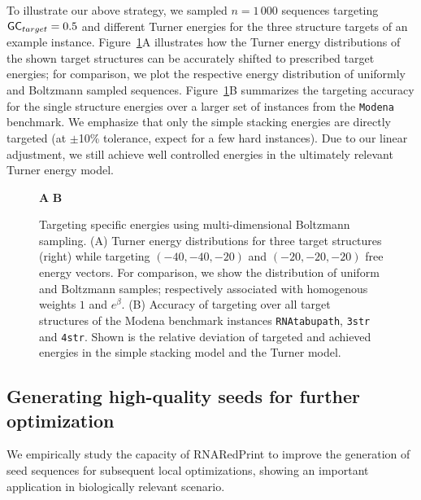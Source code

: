 \documentclass{bioinfo}
\makeatletter
\newlength{\@aligneps}
\newcommand{\includegraphicstop}[2][]{%
\sbox{\@alignepsbox}{\texttt{[image: \#2]}}%
\setlength{\@aligneps}{-\ht\@alignepsbox}%
\addtolength{\@aligneps}{2ex}%
\raisebox{\@aligneps}{\usebox{\@alignepsbox}}}
\newcommand{\Software}[1]{{\ttfamily #1}}
\newcommand{\ourprog}{\Software{RNARedPrint}}
\makeatother
\begin{document}
To illustrate our above strategy, we sampled $n=1\,000$ sequences
targeting ${\sf GC}_{target}=0.5$ and different Turner energies for
the three structure targets of an example
instance. Figure~\ref{fig:energydist}A illustrates how the Turner
energy distributions of the shown target structures can be accurately
shifted to prescribed target energies; for comparison, we plot the
respective energy distribution of uniformly and Boltzmann sampled
sequences. Figure~\ref{fig:energydist}B summarizes the targeting accuracy for the single structure energies over a larger set of instances
from the \texttt{Modena} benchmark. We emphasize that only the simple stacking energies
are directly targeted (at $\pm$10\% tolerance, expect for a few hard
instances). Due to our linear adjustment, we still achieve well
controlled energies in the ultimately relevant Turner energy model.
\begin{figure}[t]
  \begin{center}
    {\sf \bfseries A}\includegraphicstop[width=0.57\textwidth]{Figs/energy_distribution}
    {\sf \bfseries B}\includegraphicstop[width=0.32\textwidth]{Figs/offset}
  \end{center}
  \caption{%
  	Targeting specific energies using multi-dimensional Boltzmann sampling. (A) Turner energy distributions for three target structures (right) while targeting $(-40,-40,-20)$ and $(-20,-20,-20)$ free energy vectors. For comparison, we show the distribution of uniform and Boltzmann samples; respectively associated with homogenous weights $1$ and $e^\beta$. (B) Accuracy of targeting over all target structures of the \Software{Modena} benchmark instances \texttt{RNAtabupath}, \texttt{3str} and \texttt{4str}. Shown is the relative deviation of targeted and achieved energies in the simple stacking model and the Turner model.
}
  \label{fig:energydist}
\end{figure}
\subsection{Generating high-quality seeds for further optimization}
We empirically study the capacity of \ourprog{} to improve the generation of seed sequences for subsequent local optimizations, showing an important application in biologically relevant scenario.
\end{document}
